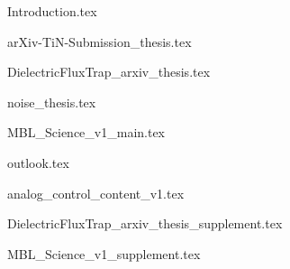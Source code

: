 





\begin{frontmatter}










\cleardoublepage
{}
\begin{singlespace}
\tableofcontents
\end{singlespace}

\end{frontmatter}

\pagestyle{plain} %

%
{Introduction.tex}

{arXiv-TiN-Submission_thesis.tex}

{DielectricFluxTrap_arxiv_thesis.tex}


{noise_thesis.tex}



{MBL_Science_v1_main.tex}

{outlook.tex}

\begin{appendices}

{analog_control_content_v1.tex}

{DielectricFluxTrap_arxiv_thesis_supplement.tex}

{MBL_Science_v1_supplement.tex}

\end{appendices}




%
%
\printbibliography


